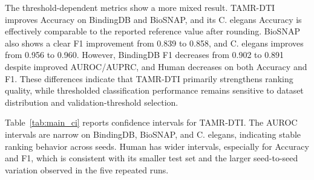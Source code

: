\begin{table}[!htbp]
\caption{Main test results on four datasets. Reference values are reported results from \citet{ji2026ldmdti}; TAMR-DTI values are five-seed mean $\pm$ standard deviation.}
\label{tab:main_results}
\begin{center}
\end{center}
\end{table}

The threshold-dependent metrics show a more mixed result. TAMR-DTI improves Accuracy on BindingDB and BioSNAP, and its C. elegans Accuracy is effectively comparable to the reported reference value after rounding. BioSNAP also shows a clear F1 improvement from 0.839 to 0.858, and C. elegans improves from 0.956 to 0.960. However, BindingDB F1 decreases from 0.902 to 0.891 despite improved AUROC/AUPRC, and Human decreases on both Accuracy and F1. These differences indicate that TAMR-DTI primarily strengthens ranking quality, while thresholded classification performance remains sensitive to dataset distribution and validation-threshold selection.

Table~\ref{tab:main_ci} reports confidence intervals for TAMR-DTI. The AUROC intervals are narrow on BindingDB, BioSNAP, and C. elegans, indicating stable ranking behavior across seeds. Human has wider intervals, especially for Accuracy and F1, which is consistent with its smaller test set and the larger seed-to-seed variation observed in the five repeated runs.


